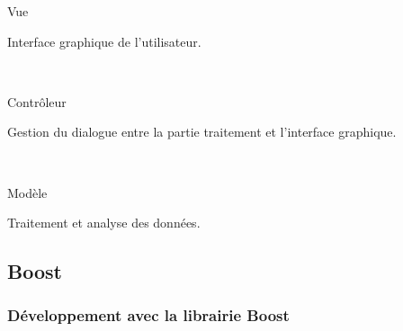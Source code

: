 {\begin{minipage}{0.45\textwidth}
\begin{flushleft}
\begin{center}
\end{center}
\end{flushleft}
\end{minipage}
\begin{minipage}{0.45\textwidth}
\begin{flushright}
\begin{block}{Vue}
\begin{center}
Interface graphique de l'utilisateur.
\end{center}
\end{block}
~\\
\begin{block}{Contrôleur}
\begin{center}
Gestion du dialogue entre la partie traitement et l'interface graphique.
\end{center}
\end{block}
~\\
\begin{block}{Modèle}
\begin{center}
Traitement et analyse des données.
\end{center}
\end{block}
\end{flushright}
\end{minipage}
}

\subsection{Boost}
\frame
{
\frametitle{D\'eveloppement avec la librairie Boost}


}